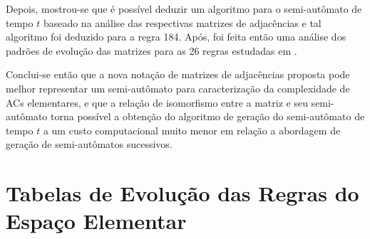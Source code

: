 \documentclass[12pt,a4paper]{article}
\begin{document}
Depois, mostrou-se que é possível deduzir um algoritmo para o semi-autômato
de tempo $t$ baseado na análise das respectivas matrizes de adjacências e tal
algoritmo foi deduzido para a regra 184. Após, foi feita então uma análise 
dos padrões de evolução das matrizes para as 26 regras estudadas em
.

Conclui-se então que a nova notação de matrizes de adjacências proposta
pode melhor representar um semi-autômato para caracterização da complexidade
de ACs elementares, e que a relação de isomorfismo entre
a matriz e seu semi-autômato torna possível a obtenção do algoritmo de
geração do semi-autômato de tempo $t$ a um custo computacional muito
menor em relação a abordagem de geração de semi-autômatos sucessivos.

\newpage

\appendix
\section{Tabelas de Evolução das Regras do Espaço Elementar}\label{sec:matrices}

\newpage
\end{document}
